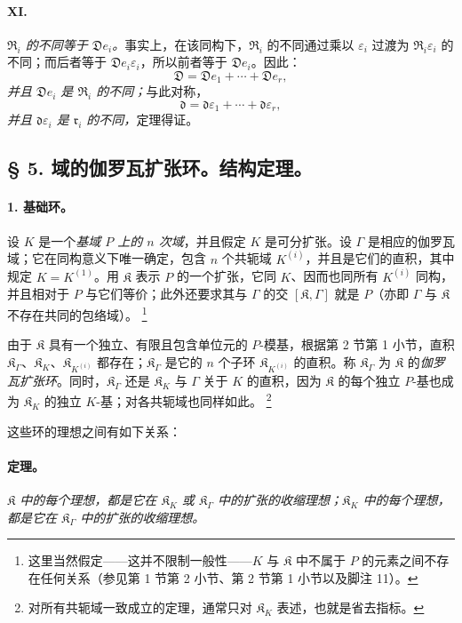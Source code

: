 \documentclass[11pt]{article}
\providecommand{\srcfn}[2]{%
  \begingroup
  \renewcommand{\thefootnote}{#1}%
  \footnote{#2}%
  \addtocounter{footnote}{-1}%
  \endgroup}
\begin{document}
\paragraph{XI.}
\emph{$\mathfrak R_i$ 的不同等于 $\mathfrak D e_i$。}事实上，在该同构下，$\mathfrak R_i$ 的不同通过乘以 $\varepsilon_i$ 过渡为 $\mathfrak R_i\varepsilon_i$ 的不同；而后者等于 $\mathfrak D e_i\varepsilon_i$，所以前者等于 $\mathfrak D e_i$。因此：
\[
\mathfrak D=\mathfrak D e_1+\cdots+\mathfrak D e_r,
\]
\emph{并且 $\mathfrak D e_i$ 是 $\mathfrak R_i$ 的不同；}与此对称，
\[
\mathfrak d=\mathfrak d\varepsilon_1+\cdots+\mathfrak d\varepsilon_r,
\]
\emph{并且 $\mathfrak d\varepsilon_i$ 是 $\mathfrak r_i$ 的不同，}定理得证。
\subsection*{\S{} 5. 域的伽罗瓦扩张环。结构定理。}

\paragraph{1. 基础环。}
设 $K$ 是一个\emph{基域 $P$ 上的 $n$ 次域}，并且假定 $K$ 是可分扩张。设 $\Gamma$ 是相应的伽罗瓦域；它在同构意义下唯一确定，包含 $n$ 个共轭域 $K^{(i)}$，并且是它们的直积，其中规定 $K=K^{(1)}$。用 $\mathfrak K$ 表示 $P$ 的一个扩张，它同 $K$、因而也同所有 $K^{(i)}$ 同构，并且相对于 $P$ 与它们等价；此外还要求其与 $\Gamma$ 的交 $[\mathfrak K,\Gamma]$ 就是 $P$（亦即 $\Gamma$ 与 $\mathfrak K$ 不存在共同的包络域）。\srcfn{15)}{这里当然假定——这并不限制一般性——$K$ 与 $\mathfrak K$ 中不属于 $P$ 的元素之间不存在任何关系（参见第 1 节第 2 小节、第 2 节第 1 小节以及脚注 11）。}由于 $\mathfrak K$ 具有一个独立、有限且包含单位元的 $P$-模基，根据第 2 节第 1 小节，直积 $\mathfrak K_\Gamma$、$\mathfrak K_K$、$\mathfrak K_{K^{(i)}}$ 都存在；$\mathfrak K_\Gamma$ 是它的 $n$ 个子环 $\mathfrak K_{K^{(i)}}$ 的直积。称 $\mathfrak K_\Gamma$ 为 $\mathfrak K$ 的\emph{伽罗瓦扩张环}。同时，$\mathfrak K_\Gamma$ 还是 $\mathfrak K_K$ 与 $\Gamma$ 关于 $K$ 的直积，因为 $\mathfrak K$ 的每个独立 $P$-基也成为 $\mathfrak K_K$ 的独立 $K$-基；对各共轭域也同样如此。\srcfn{16)}{对所有共轭域一致成立的定理，通常只对 $\mathfrak K_K$ 表述，也就是省去指标。}这些环的理想之间有如下关系：

\paragraph{定理。}
\emph{$\mathfrak K$ 中的每个理想，都是它在 $\mathfrak K_K$ 或 $\mathfrak K_\Gamma$ 中的扩张的收缩理想；$\mathfrak K_K$ 中的每个理想，都是它在 $\mathfrak K_\Gamma$ 中的扩张的收缩理想。}
\end{document}

